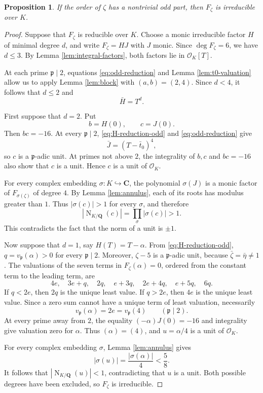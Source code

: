 \documentclass[11pt]{article}
\newtheorem{proposition}[theorem]{Proposition}
\newcommand{\Q}{\mathbf Q}
\newcommand{\C}{\mathbf C}
\newcommand{\OK}{\mathcal O_K}
\newcommand{\Norm}{\operatorname{N}}
\begin{document}
\begin{proposition}\label{prop:odd-part}
If the order of $\zeta$ has a nontrivial odd part, then $F_\zeta$ is
irreducible over $K$.
\end{proposition}

\begin{proof}
Suppose that $F_\zeta$ is reducible over $K$.  Choose a monic
irreducible factor $H$ of minimal degree $d$, and write
$F_\zeta=HJ$ with $J$ monic.  Since $\deg F_\zeta=6$, we have $d\leq3$.
By Lemma \ref{lem:integral-factors}, both factors lie in $\OK[T]$.

At each prime $\mathfrak p\mid2$, equations
\eqref{eq:odd-reduction} and Lemma \ref{lem:t0-valuation} allow us to
apply Lemma \ref{lem:block} with $(a,b)=(2,4)$.  Since $d<4$, it follows
that $d\leq2$ and
\begin{equation}\label{eq:H-reduction-odd}
 \bar H=T^d.
\end{equation}

First suppose that $d=2$.  Put
\[
 b=H(0),\qquad c=J(0).
\]
Then $bc=-16$.  At every $\mathfrak p\mid2$,
\eqref{eq:H-reduction-odd} and \eqref{eq:odd-reduction} give
\[
 \bar J=(T-\bar t_0)^4,
\]
so $c$ is a $\mathfrak p$-adic unit.  At primes not above $2$, the
integrality of $b,c$ and $bc=-16$ also show that $c$ is a unit.  Hence
$c$ is a unit of $\OK$.

For every complex embedding $\sigma:K\hookrightarrow\C$, the polynomial
$\sigma(J)$ is a monic factor of $F_{\sigma(\zeta)}$ of degree $4$.
By Lemma \ref{lem:annulus}, each of its roots has modulus greater than
$1$.  Thus $|\sigma(c)|>1$ for every $\sigma$, and therefore
\[
 |\Norm_{K/\Q}(c)|=\prod_\sigma|\sigma(c)|>1.
\]
This contradicts the fact that the norm of a unit is $\pm1$.

Now suppose that $d=1$, say $H(T)=T-\alpha$.  From
\eqref{eq:H-reduction-odd}, $q=v_{\mathfrak p}(\alpha)>0$ for every
$\mathfrak p\mid2$.  Moreover, $\zeta-5$ is a $\mathfrak p$-adic unit,
because $\bar\zeta=\bar\eta\neq1$.  The valuations of the seven terms in
$F_\zeta(\alpha)=0$, ordered from the constant term to the leading term,
are
\[
 4e,\quad 3e+q,\quad 2q,\quad e+3q,
 \quad 2e+4q,\quad e+5q,\quad 6q.
\]
If $q<2e$, then $2q$ is the unique least value.  If $q>2e$, then $4e$
is the unique least value.  Since a zero sum cannot have a unique term
of least valuation, necessarily
\begin{equation}\label{eq:q-2e}
 v_{\mathfrak p}(\alpha)=2e=v_{\mathfrak p}(4)
 \qquad(\mathfrak p\mid2).
\end{equation}
At every prime away from $2$, the equality
$(-\alpha)J(0)=-16$ and integrality give valuation zero for $\alpha$.
Thus $(\alpha)=(4)$, and $u=\alpha/4$ is a unit of $\OK$.

For every complex embedding $\sigma$, Lemma \ref{lem:annulus} gives
\[
 |\sigma(u)|=\frac{|\sigma(\alpha)|}{4}<\frac58.
\]
It follows that $|\Norm_{K/\Q}(u)|<1$, contradicting that $u$ is a
unit.  Both possible degrees have been excluded, so $F_\zeta$ is
irreducible.
\end{proof}
\end{document}
